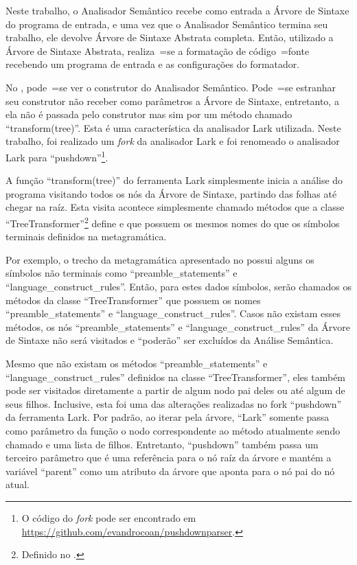 Neste trabalho,
o Analisador Semântico recebe como entrada a Árvore de Sintaxe do programa de entrada,
e uma vez que o Analisador Semântico termina seu trabalho,
ele devolve Árvore de Sintaxe Abstrata completa.
Então,
utilizado a Árvore de Sintaxe Abstrata,
realiza~=se a formatação de código~=fonte recebendo um programa de entrada e
as configurações do formatador.

No ,
pode~=se ver o construtor do Analisador Semântico.
Pode~=se estranhar seu construtor não receber como parâmetros a Árvore de Sintaxe,
entretanto,
a ela não é passada pelo construtor mas sim por um método chamado ``transform(tree)''.
Esta é uma característica da analisador Lark utilizada.
Neste trabalho,
foi realizado um \textit{fork} \cite{overviewOfGitHubForks,mayTheForkBeWithYou,collaborationAmongGitHubUsers} da analisador Lark e
foi renomeado o analisador Lark para ``pushdown''\footnote{%
O código do \textit{fork} pode ser encontrado em \url{https://github.com/evandrocoan/pushdownparser}.
}.

A função ``transform(tree)'' do ferramenta Lark simplesmente inicia a análise do programa visitando todos os nós da Árvore de Sintaxe,
partindo das folhas até chegar na raíz.
Esta visita acontece simplesmente chamado métodos que a classe ``TreeTransformer''\footnote{%
Definido no .
} define e
que possuem os mesmos nomes do que os símbolos terminais definidos na metagramática.

Por exemplo,
o trecho da metagramática apresentado no  possui alguns os símbolos não terminais como ``preamble\_statements'' e
``language\_construct\_rules''. Então,
para estes dados símbolos,
serão chamados os métodos da classe ``TreeTransformer'' que possuem os nomes ``preamble\_statements'' e
``language\_construct\_rules''.
Casos não existam esses métodos,
os nós ``preamble\_statements'' e
``language\_construct\_rules'' da Árvore de Sintaxe não será visitados e
``poderão'' ser excluídos da Análise Semântica.

Mesmo que não existam os métodos ``preamble\_statements'' e
``language\_construct\_rules'' definidos na classe ``TreeTransformer'',
eles também pode ser visitados diretamente a partir de algum nodo pai deles ou
até algum de seus filhos.
Inclusive,
esta foi uma das alterações realizadas no fork ``pushdown'' da ferramenta Lark.
Por padrão,
ao iterar pela árvore,
``Lark'' somente passa como parâmetro da função o nodo correspondente ao método atualmente sendo chamado e
uma lista de filhos.
Entretanto,
``pushdown'' também passa um terceiro parâmetro que é uma referência para o nó raíz da árvore e
mantém a variável ``parent'' como um atributo da árvore que aponta para o nó pai do nó atual.

